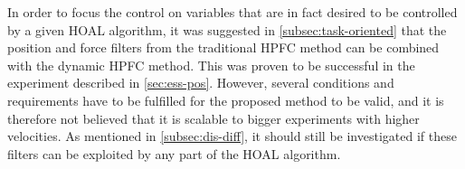 In order to focus the control on variables that are in fact desired to be controlled by a given HOAL algorithm, it was suggested in \ref{subsec:task-oriented} that the position and force filters from the traditional HPFC method can be combined with the dynamic HPFC method. This was proven to be successful in the experiment described in \ref{sec:ess-pos}. However, several conditions and requirements have to be fulfilled for the proposed method to be valid, and it is therefore not believed that it is scalable to bigger experiments with higher velocities. As mentioned in \ref{subsec:dis-diff}, it should still be investigated if these filters can be exploited by any part of the HOAL algorithm.


